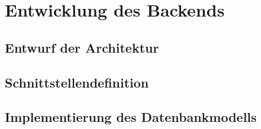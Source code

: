 \chapter{Entwicklung des Backends}\label{ch:Entwicklung des Backends}
\section{Entwurf der Architektur}\label{sec:Entwurf der Architektur}
\section{Schnittstellendefinition}\label{sec:Schnittstellendefinition}
\section{Implementierung des Datenbankmodells}\label{sec:Implementierung des Datenbankmodells}
